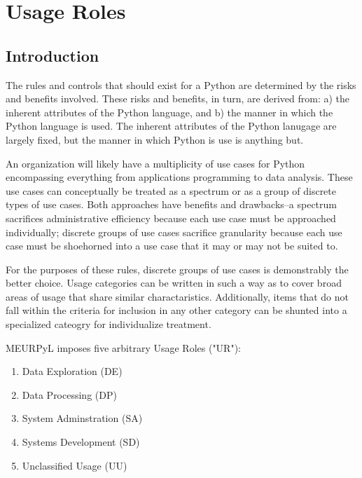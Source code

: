 \section{Usage Roles}

\thispagestyle{section_start_style}

	\subsection*{Introduction}

		The rules and controls that should exist for a Python are determined by the risks and benefits involved. These risks and benefits, in turn, are derived from: a) the inherent attributes of the Python language, and b) the manner in which the Python language is used. The inherent attributes of the Python lanugage are largely fixed, but the manner in which Python is use is anything but.

		An organization will likely have a multiplicity of use cases for Python encompassing everything from applications programming to data analysis. These use cases can conceptually be treated as a spectrum or as a group of discrete types of use cases. Both approaches have benefits and drawbacks--a spectrum sacrifices administrative efficiency because each use case must be approached individually; discrete groups of use cases sacrifice granularity because each use case must be shoehorned into a use case that it may or may not be suited to.

		For the purposes of these rules, discrete groups of use cases is demonstrably the better choice. Usage categories can be written in such a way as to cover broad areas of usage that share similar charactaristics. Additionally, items that do not fall within the criteria for inclusion in any other category can be shunted into a specialized cateogry for individualize treatment.

		MEURPyL imposes five arbitrary Usage Roles ("UR"):

		\begin{enumerate}
        	\item Data Exploration (DE)
        	\item Data Processing (DP)
        	\item System Adminstration (SA)
        	\item Systems Development (SD)
        	\item Unclassified Usage (UU)
        \end{enumerate}

